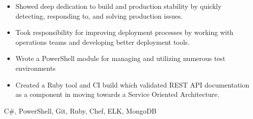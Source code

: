 \begin{experiences}
{\begin{itemize}
                        \item Showed deep dedication to build and production stability by quickly detecting, responding to, and solving production issues.
                        \item Took responsibility for improving deployment processes by working with operations teams and developing better deployment tools.
                        \item Wrote a PowerShell module for managing and utilizing numerous test environments
                        \item Created a Ruby tool and CI build which validated REST API documentation as a component in moving towards a Service Oriented Architecture.
                        \fi
                      \end{itemize}
                    }
                    {C\#, PowerShell, Git, Ruby, Chef, ELK, MongoDB}
\end{experiences}
